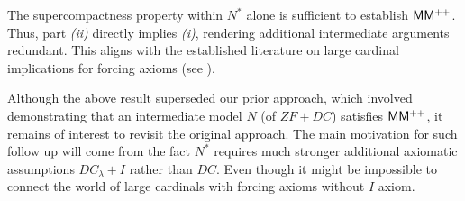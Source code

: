The supercompactness property within $N^\ast$ alone is sufficient to establish ${\sf MM^{++}}$. Thus, part \textit{(ii)} directly implies \textit{(i)}, rendering additional intermediate arguments redundant. This aligns with the established literature on large cardinal implications for forcing axioms (see \cite{aspero2021sf}).

Although the above result superseded our prior approach, which involved demonstrating that an intermediate model $N$ (of $ZF+DC$) satisfies ${\sf MM^{++}}$, it remains of interest to revisit the original approach.
The main motivation for such follow up will come from the fact $N^\ast$ requires much stronger additional axiomatic assumptions $DC_\lambda+I$ rather than $DC$. Even though it might be impossible to connect the world of large cardinals with forcing axioms without $I$ axiom.
